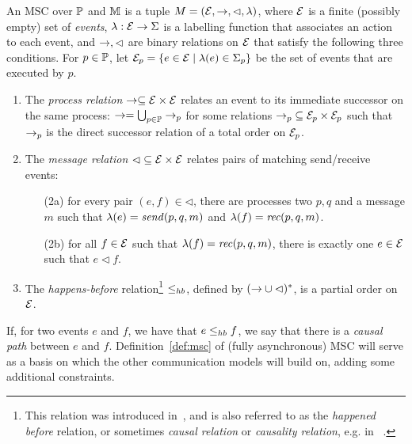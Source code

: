 \begin{definition}[MSC]\label{def:msc}
	An {MSC}  over $\mathbb{P}$ and $\mathbb{M}$ is a tuple $M = (\mathcal{E},\to,\lhd,\lambda)$, where 
	$\mathcal{E}$ is a finite (possibly empty) set of \emph{events}, $\lambda: \mathcal{E} \to \Sigma$ is a labelling 
	function that associates an action to each event,
	and $\to,\lhd$ are binary relations on $\mathcal{E}$ that satisfy the following three conditions.
	For $p \in \mathbb{P}$, let $\mathcal{E}_p = \{e \in \mathcal{E} \mid \lambda(e) \in \Sigma_{p}\}$ be 
	the set of events that are executed by $p$. 
	\begin{enumerate}
		\item The \emph{process relation} $\to\subseteq \mathcal{E} \times \mathcal{E}$ 
		relates an event to its immediate successor on
		the same process:
		$\to=\bigcup_{p \in \mathbb{P}} \to_p$ for some 
		relations ${\to_p} \subseteq \mathcal{E}_p \times \mathcal{E}_p$ such that $\to_p$ is 
		the direct successor relation of a total order on $\mathcal{E}_p$.  
		\item The \emph{message relation} ${\lhd} \subseteq \mathcal{E} \times \mathcal{E}$ 
		relates pairs of matching send/receive events: 	
		\begin{enumerate}%
			\item[(2a)] for every pair $(e,f) \in {\lhd}$, there are processes two $p,q$ and a message $m$ such that $\lambda(e) = \mathit{send}(p, q, m)$ and $\lambda(f) = \mathit{rec}(p, q, m)$.
			\item[(2b)] for all $f \in \mathcal{E}$ such that $\lambda(f) = \mathit{rec}(p, q, m)$, %
			there is exactly one $e \in \mathcal{E}$ such that $e \lhd f$.
		\end{enumerate}
		\item The \emph{happens-before} relation\footnote{This relation was introduced in~\cite{Lamport78}, and is also referred to as the \emph{happened before} relation,
		or sometimes \emph{causal relation} or \emph{causality relation}, e.g. in~\cite{DBLP:journals/dc/Charron-BostMT96,DBLP:conf/cav/BouajjaniEJQ18} .} ${\leq_{hb}}$, defined by $({\to} \cup {\lhd})^\ast$,
		is a partial order on $\mathcal{E}$.
	\end{enumerate}
\end{definition}

 If, for two events $e$ and $f$, we have that $e \leq_{hb} f$, we   say that there is a \emph{causal path} between $e$ and $f$.
Definition~\ref{def:msc} of (fully asynchronous) MSC will serve as a basis on which the other communication models will build on, adding some additional constraints.

